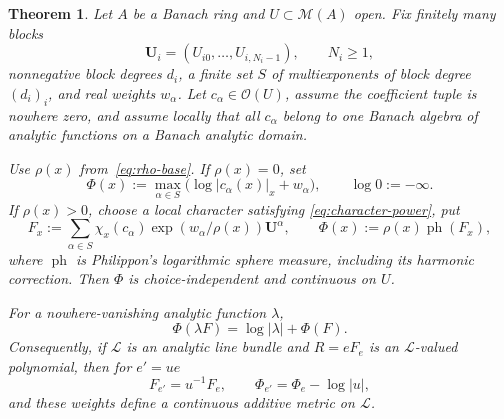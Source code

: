 \documentclass[11pt]{article}
\newtheorem{theorem}{Theorem}
\newcommand{\ph}{\operatorname{ph}}
\newcommand{\cM}{\mathcal M}
\newcommand{\abs}[1]{\lvert#1\rvert}
\begin{document}
\medskip
\Needspace{0.32\textheight}
\begin{theorem}
\label{thm:weighted-PG}
Let $A$ be a Banach ring and $U\subset\cM(A)$ open.  Fix finitely many
blocks
\[
 \mathbf U_i=(U_{i0},\ldots,U_{i,N_i-1}),\qquad N_i\geq1,
\]
nonnegative block degrees $d_i$, a finite set $S$ of multiexponents of
block degree $(d_i)_i$, and real weights $w_\alpha$.  Let
$c_\alpha\in\mathcal O(U)$, assume the coefficient tuple is nowhere zero,
and assume locally that all $c_\alpha$ belong to one Banach algebra of
analytic functions on a Banach analytic domain.

Use $\rho(x)$ from~\eqref{eq:rho-base}.  If $\rho(x)=0$, set
\begin{equation}
 \Phi(x):=\max_{\alpha\in S}
 \bigl(\log\abs{c_\alpha(x)}_x+w_\alpha\bigr),
 \qquad \log0:=-\infty.
\tag{PG$_0$}\label{eq:PG-zero}
\end{equation}
If $\rho(x)>0$, choose a local character satisfying
\eqref{eq:character-power}, put
\begin{equation}
 F_x:=\sum_{\alpha\in S}\chi_x(c_\alpha)
       \exp(w_\alpha/\rho(x))\mathbf U^\alpha,
 \qquad
 \Phi(x):=\rho(x)\ph(F_x),
\tag{PG$_+$}\label{eq:PG-positive}
\end{equation}
where $\ph$ is Philippon's logarithmic sphere measure, including its
harmonic correction.  Then $\Phi$ is choice-independent and continuous on
$U$.

For a nowhere-vanishing analytic function $\lambda$,
\begin{equation}
 \Phi(\lambda F)=\log\abs\lambda+\Phi(F).
\tag{3.1}\label{eq:PG-homogeneity}
\end{equation}
Consequently, if $\mathcal L$ is an analytic line bundle and
$R=eF_e$ is an $\mathcal L$-valued polynomial, then for $e'=ue$
\begin{equation}
 F_{e'}=u^{-1}F_e,
 \qquad
 \Phi_{e'}=\Phi_e-\log\abs u,
\tag{3.2}\label{eq:PG-frame}
\end{equation}
and these weights define a continuous additive metric on $\mathcal L$.
\end{theorem}
\end{document}
